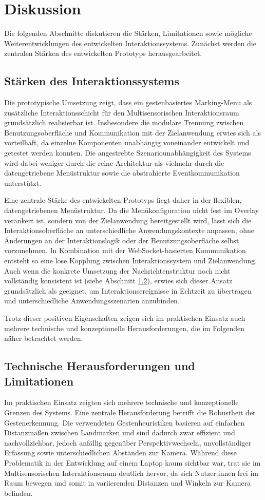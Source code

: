 
\section{Diskussion}
Die folgenden Abschnitte diskutieren die Stärken, Limitationen sowie mögliche Weiterentwicklungen des entwickelten Interaktionssystems.
Zunächst werden die zentralen Stärken des entwickelten Prototyps herausgearbeitet.


\subsection{Stärken des Interaktionssystems}
Die prototypische Umsetzung zeigt, dass ein gestenbasiertes Marking-Menu als zusätzliche Interaktionsschicht für den Multisensorischen Interaktionsraum grund\-sätzlich realisierbar ist. Insbesondere die modulare Trennung zwischen Benutzungsoberfläche und Kommunikation mit der Zielanwendung erwies sich als vorteilhaft, da einzelne Komponenten unabhängig voneinander entwickelt und getestet werden konnten. Die angestrebte Szenariounabhängigkeit des Systems wird dabei weniger durch die reine Architektur als vielmehr durch die datengetriebene Menüstruktur sowie die abstrahierte Eventkommunikation unterstützt.

Eine zentrale Stärke des entwickelten Prototyps liegt daher in der flexiblen, datengetriebenen Menüstruktur. Da die Menükonfiguration nicht fest im Overlay verankert ist, sondern von der Zielanwendung bereitgestellt wird, lässt sich die Interaktionsoberfläche an unterschiedliche Anwendungskontexte anpassen, ohne Änderungen an der Interaktionslogik oder der Benutzungsoberfläche selbst vorzunehmen. In Kombination mit der WebSocket-basierten Kommunikation entsteht so eine lose Kopplung zwischen Interaktionssystem und Zielanwendung. Auch wenn die konkrete Umsetzung der Nachrichtenstruktur noch nicht vollständig konsistent ist (siehe Abschnitt \ref{sec:herausforderungen}), erwies sich dieser Ansatz grund\-sätzlich als geeignet, um Interaktionsereignisse in Echtzeit zu übertragen und unterschiedliche Anwendungsszenarien anzubinden.

Trotz dieser positiven Eigenschaften zeigen sich im praktischen Einsatz auch mehrere technische und konzeptionelle Herausforderungen, die im Folgenden näher betrachtet werden.


\subsection{Technische Herausforderungen und Limitationen}
\label{sec:herausforderungen}
Im praktischen Einsatz zeigten sich mehrere technische und konzeptionelle Grenzen des Systems. Eine zentrale Herausforderung betrifft die Robustheit der Gestenerkennung. Die verwendeten Gestenheuristiken basieren auf einfachen Distanzmaßen zwischen Landmarken und sind dadurch zwar effizient und nachvollziehbar, jedoch anfällig gegenüber Perspektivwechseln, unvollständiger Erfassung sowie unterschiedlichen Abständen zur Kamera. Während diese Problematik in der Entwicklung auf einem Laptop kaum sichtbar war, trat sie im Multisensorischen Interaktionsraum deutlich hervor, da sich Nutzer:innen frei im Raum bewegen und somit in variierenden Distanzen und Winkeln zur Kamera befinden.

